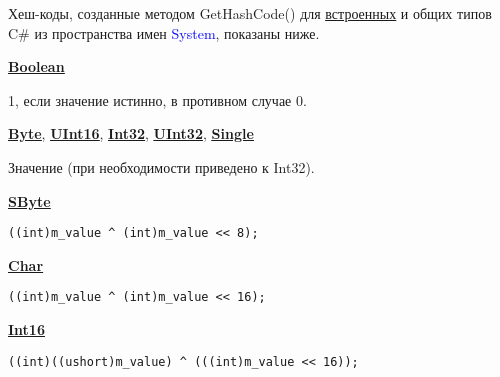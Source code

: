 Хеш-коды, созданные методом { GetHashCode()} для \href{https://vk.cc/atP5zf}{\underline{встроенных}} и общих типов C\# из пространства имен { \textcolor{Blue}{System}}, показаны ниже.

\vspace{\baselineskip}

\href{https://vk.cc/atQsfj}{\underline{\textbf{Boolean}}}

\vspace{\baselineskip}

1, если значение истинно, в противном случае 0.

\vspace{\baselineskip}

\href{https://vk.cc/atQsma}{\underline{\textbf{Byte}}}, \href{https://vk.cc/atQsrb}{\underline{\textbf{UInt16}}}, \href{https://vk.cc/atQsuT}{\underline{\textbf{Int32}}}, \href{https://vk.cc/atQsxE}{\underline{\textbf{UInt32}}}, \href{https://vk.cc/atQsAL}{\underline{\textbf{Single}}}

\vspace{\baselineskip}

Значение (при необходимости приведено к Int32).

\vspace{\baselineskip}

\href{https://vk.cc/atQt16}{\underline{\textbf{SByte}}}

\begin{tcolorbox}
\begin{verbatim}
((int)m_value ^ (int)m_value << 8);
\end{verbatim}
\end{tcolorbox}

\href{https://vk.cc/atQtak}{\underline{\textbf{Char}}}

\begin{tcolorbox}
\begin{verbatim}
((int)m_value ^ (int)m_value << 16);
\end{verbatim}
\end{tcolorbox}

\href{https://vk.cc/atQte7}{\underline{\textbf{Int16}}}

\begin{tcolorbox}
\begin{verbatim}
((int)((ushort)m_value) ^ (((int)m_value << 16));
\end{verbatim}
\end{tcolorbox}

